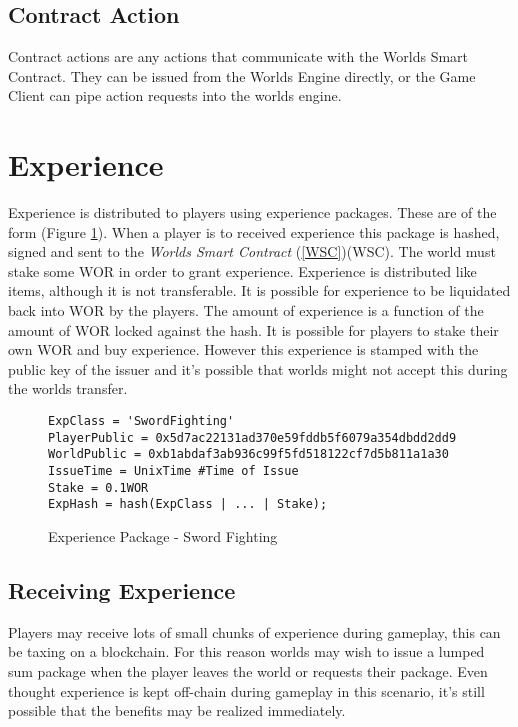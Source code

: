 \documentclass[runningheads,a4paper]{llncs}
\begin{document}
\subsection{Contract Action}
Contract actions are any actions that communicate with the Worlds Smart Contract. They can be issued from the Worlds Engine directly, or the Game Client can pipe action requests into the worlds engine. 

\section{Experience}
\label{exp}
Experience is distributed to players using experience packages. These are of the form (Figure \ref{exppkg}). When a player is to received experience this package is hashed, signed and sent to the \textit{Worlds Smart Contract} (\ref{WSC})(WSC). The world must stake some WOR in order to grant experience. Experience is distributed like items, although it is not transferable. It is possible for experience to be liquidated back into WOR by the players. The amount of experience is a function of the amount of WOR locked against the hash. It is possible for players to stake their own WOR and buy experience. However this experience is stamped with the public key of the issuer and it's possible that worlds might not accept this during the worlds transfer. 

\begin{figure}[H]
\centering
\caption{Experience Package - Sword Fighting}
\label{exppkg}
\begin{lstlisting}
ExpClass = 'SwordFighting'
PlayerPublic = 0x5d7ac22131ad370e59fddb5f6079a354dbdd2dd9
WorldPublic = 0xb1abdaf3ab936c99f5fd518122cf7d5b811a1a30
IssueTime = UnixTime #Time of Issue
Stake = 0.1WOR
ExpHash = hash(ExpClass | ... | Stake);
\end{lstlisting}
\end{figure}

\subsection{Receiving Experience} 
Players may receive lots of small chunks of experience during gameplay, this can be taxing on a blockchain. For this reason worlds may wish to issue a lumped sum package when the player leaves the world or requests their package. Even thought experience is kept off-chain during gameplay in this scenario, it's still possible that the benefits may be realized immediately.  
\end{document}
